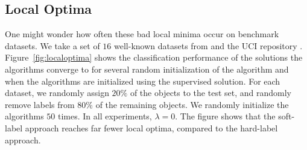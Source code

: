 \documentclass[twoside]{memoir}\usepackage[]{graphicx}\usepackage{xcolor}
\begin{document}
\subsection{Local Optima}
One might wonder how often these bad local minima occur on benchmark datasets. We take a set of $16$ well-known datasets from \citet{Chapelle2006} and the UCI repository \citep{Lichman2013}. Figure~\ref{fig:localoptima} shows the classification performance of the solutions the algorithms converge to for several random initialization of the algorithm and when the algorithms are initialized using the supervised solution. For each dataset, we randomly assign $20\%$ of the objects to the test set, and randomly remove labels from $80\%$ of the remaining objects. We randomly initialize the algorithms $50$ times. In all experiments, $\lambda=0$. The figure shows that the soft-label approach reaches far fewer local optima, compared to the hard-label approach.
\end{document}
